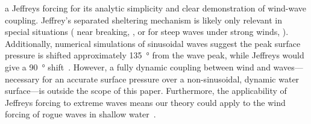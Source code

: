 \documentclass{jfm}
\begin{document}
a Jeffreys forcing for its analytic simplicity and clear demonstration
of wind-wave coupling.
Jeffrey's separated sheltering mechanism is likely only relevant
in special situations (\eg{} near breaking,
\citealp{banner1976separation}, or for steep waves under strong winds,
\citealp{tian2013evolution,touboul2006interaction}).
Additionally, numerical simulations of sinusoidal waves suggest the peak
surface pressure is shifted approximately \SI{135}{\degree} from the
wave peak, while Jeffreys would give a \SI{90}{\degree}
shift~\citep{husain2019boundary}.
However, a fully dynamic coupling between wind and waves---necessary for
an accurate surface pressure over a non-sinusoidal, dynamic water
surface---is outside the scope of this paper.
Furthermore, the applicability of Jeffreys forcing to extreme waves
means our theory could apply to the wind forcing of rogue waves in
shallow water~\citep{kharif2008influence}.
\end{document}
